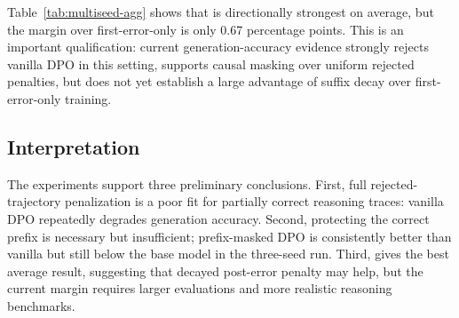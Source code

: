 Table~\ref{tab:multiseed-agg} shows that \cmdpo is directionally strongest on average, but the margin over first-error-only is only 0.67 percentage points. This is an important qualification: current generation-accuracy evidence strongly rejects vanilla DPO in this setting, supports causal masking over uniform rejected penalties, but does not yet establish a large advantage of suffix decay over first-error-only training.

\subsection{Interpretation}

The experiments support three preliminary conclusions. First, full rejected-trajectory penalization is a poor fit for partially correct reasoning traces: vanilla DPO repeatedly degrades generation accuracy. Second, protecting the correct prefix is necessary but insufficient; prefix-masked DPO is consistently better than vanilla but still below the base model in the three-seed run. Third, \cmdpo gives the best average result, suggesting that decayed post-error penalty may help, but the current margin requires larger evaluations and more realistic reasoning benchmarks.
